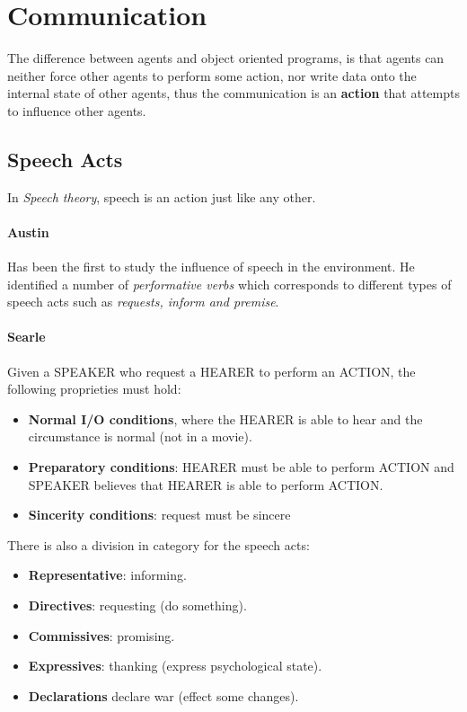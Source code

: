\documentclass[10pt,a4paper]{article}
\begin{document}
\section{Communication}
The difference between agents and object oriented programs, is that agents can neither force other agents to perform some action, nor write data onto the internal state of other agents, thus the communication is an \textbf{action} that attempts to influence other agents.

\subsection{Speech Acts}
In \textit{Speech theory}, speech is an action just like any other.

\paragraph{Austin}
Has been the first to study the influence of speech in the environment. He identified a number of \textit{performative verbs} which corresponds to different types of speech acts such as \textit{requests, inform and premise}.

\paragraph{Searle}
Given a SPEAKER who request a HEARER to perform an ACTION, the following proprieties must hold:
\begin{itemize}
\item \textbf{Normal I/O conditions}, where the HEARER is able to hear and the circumstance is normal (not in a movie).
\item \textbf{Preparatory conditions}: HEARER must be able to perform ACTION and SPEAKER believes that HEARER is able to perform ACTION.
\item \textbf{Sincerity conditions}: request must be sincere
\end{itemize}

There is also a division in category for the speech acts:
\begin{itemize}
\item \textbf{Representative}: informing.
\item \textbf{Directives}: requesting (do something).
\item \textbf{Commissives}: promising.
\item \textbf{Expressives}: thanking (express psychological state).
\item \textbf{Declarations} declare war (effect some changes).
\end{itemize}
\end{document}

